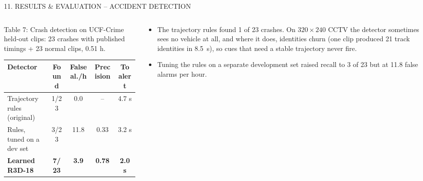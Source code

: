 \documentclass[aspectratio=169,10pt,t]{beamer}
\begin{document}
\begin{frame}{11. RESULTS \& EVALUATION -- ACCIDENT DETECTION}
\begin{columns}[T,onlytextwidth]
\begin{column}{0.47\textwidth}
\centering
{\tiny Table 7: Crash detection on UCF-Crime held-out clips: 23 crashes with published timings + 23 normal clips,
0.51 h.}\\[0.2em]
\scriptsize
\setlength{\tabcolsep}{2.4pt}
\begin{tabular}{@{}lcccc@{}}
\toprule
\textbf{Detector} & \textbf{Found} & \textbf{False al./h} & \textbf{Precision} & \textbf{To alert}\\
\midrule
Trajectory rules (original) & 1/23 & 0.0 & -- & 4.7 s\\
Rules, tuned on a dev set & 3/23 & 11.8 & 0.33 & 3.2 s\\
\textbf{Learned R3D-18} & \textbf{7/23} & \textbf{3.9} & \textbf{0.78} & \textbf{2.0 s}\\
\bottomrule
\end{tabular}
\vspace{0.6em}
\end{column}
\begin{column}{0.5\textwidth}
\scriptsize
\begin{itemize}\setlength{\itemsep}{0.25em}
  \item The trajectory rules found 1 of 23 crashes. On $320\times240$ CCTV the detector sometimes sees no vehicle at
        all, and where it does, identities churn (one clip produced 21 track identities in 8.5~s), so cues that need
        a stable trajectory never fire.
  \item Tuning the rules on a separate development set raised recall to 3 of 23 but at 11.8 false alarms per hour.

\end{itemize}
\end{column}
\end{columns}
\end{frame}
\end{document}
